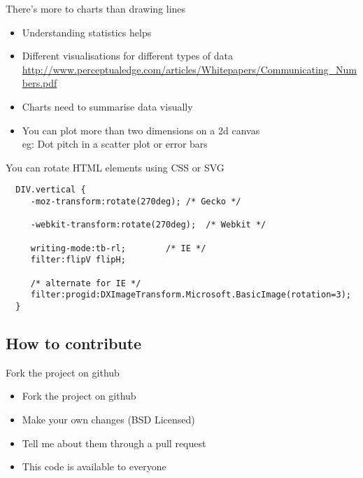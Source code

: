 \documentclass{beamer}
\begin{document}
\begin{frame}{There's more to charts than drawing lines}
  \begin{itemize}
  \item Understanding statistics helps
  \item Different visualisations for different types of data \\ \href{http://www.perceptualedge.com/articles/Whitepapers/Communicating\_Numbers.pdf}{\tiny{http://www.perceptualedge.com/articles/Whitepapers/Communicating\_Numbers.pdf}}
  \item Charts need to summarise data visually
  \item You can plot more than two dimensions on a 2d canvas \\ \tiny{eg: Dot pitch in a scatter plot or error bars}
  \end{itemize}
\end{frame}

\begin{frame}[fragile]{You can rotate HTML elements using CSS or SVG}
  \begin{verbatim}
  DIV.vertical {
     -moz-transform:rotate(270deg);	/* Gecko */

     -webkit-transform:rotate(270deg);	/* Webkit */

     writing-mode:tb-rl;		/* IE */
     filter:flipV flipH;

     /* alternate for IE */
     filter:progid:DXImageTransform.Microsoft.BasicImage(rotation=3);
  }
  \end{verbatim}
\end{frame}

\subsection{How to contribute}

\begin{frame}{Fork the project on github}
  \begin{block}{}
  \end{block}
  \begin{itemize}
  \item Fork the project on github
  \item Make your own changes (BSD Licensed)
  \item Tell me about them through a pull request
  \item This code is available to everyone
  \end{itemize}
\end{frame}
\end{document}

